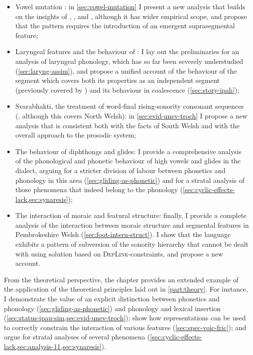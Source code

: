 \begin{itemize}
\item Vowel mutation \citep{allen75:_vowel_mutat_word_stres_welsh,cartmill76:_welsh_vowel_mutat,thomas84:_north_welsh,bosch96:_promin,greenbook,hannahs07:_const_welsh}: in \cref{sec:vowel-mutation} I present a new analysis that builds on the insights of \citet{hannahs07:_const_welsh}, \citet{bosch96:_promin}, and \citet{greenbook}, although it has wider empirical scope, and propose that the pattern requires the introduction of an emergent suprasegmental feature;
\item Laryngeal features and the behaviour of \ipa{[h]} \citep{hannahs11:_welsh}: I lay out the preliminaries for an analysis of laryngeal phonology, which has so far been severely understudied (\cref{sec:laryng-assim}), and propose a unified account of the behaviour of the segment \ipa{[h]} which covers both its properties as an independent segment (previously covered by \citeauthor{hannahs11:_welsh} \cite*{hannahs11:_welsh}) and its behaviour in coalescence (\cref{sec:story-ipah});
\item Svarabhakti, \ie the treatment of word\hyp final rising\hyp sonority consonant sequences (\cf \citealp{hannahs09:_welsh}, although this covers North Welsh): in \cref{sec:evid-unev-troch} I propose a new analysis that is consistent both with the facts of South Welsh and with the overall approach to the prosodic system;
\item The behaviour of diphthongs and glides: I provide a comprehensive analysis of the phonological and phonetic behaviour of high vowels and glides in the dialect, arguing for a stricter division of labour between phonetics and phonology in this area (\cref{sec:gliding-as-phonetic}) and for a stratal analysis of those phenomena that indeed belong to the phonology (\cref{sec:cyclic-effects-lack,sec:synaresis});
\item The interaction of moraic and featural structure: finally, I provide a complete analysis of the interaction between moraic structure and segmental features in Pembrokeshire Welsh (\cref{sec:foot-intern-struct}). I show that the language exhibits a pattern of subversion of the sonority hierarchy that cannot be dealt with using  solution based on \textsc{DepLink}-\mo constraints, and propose a new account.
\end{itemize}

From the theoretical perspective, the chapter provides an extended example of the application of the theoretical principles laid out in \cref{part:theory}. For instance, I demonstrate the value of an explicit distinction between phonetics and phonology (\cref{sec:gliding-as-phonetic}) and phonology and lexical insertion (\cref{sec:status-ipau-sim,sec:evid-unev-troch}); show how representations can be used to correctly constrain the interaction of various features (\cref{sec:spec-voic-fric}); and argue for stratal analyses of several phenomena (\cref{sec:cyclic-effects-lack,sec:analysis-11,sec:synaresis}).

